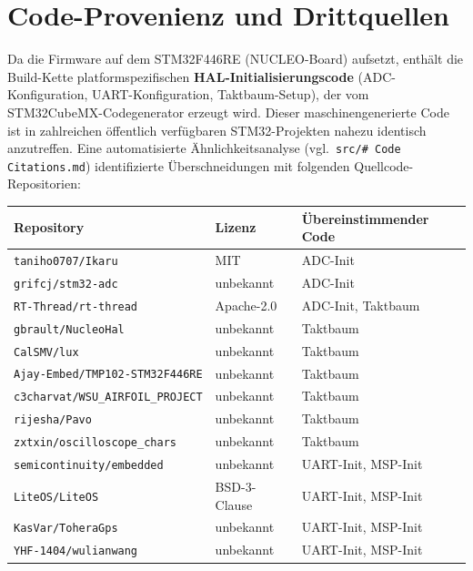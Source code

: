\section{Code-Provenienz und Drittquellen}
\label{sec:sensor_citations}

Da die Firmware auf dem STM32F446RE (NUCLEO-Board) aufsetzt, enthält die Build-Kette platformspezifischen \textbf{HAL-Initialisierungscode} (ADC-Konfiguration, UART-Konfiguration, Taktbaum-Setup), der vom STM32CubeMX-Codegenerator erzeugt wird.
Dieser maschinengenerierte Code ist in zahlreichen öffentlich verfügbaren STM32-Projekten nahezu identisch anzutreffen.
Eine automatisierte Ähnlichkeitsanalyse (vgl.\ \texttt{src/\# Code Citations.md}) identifizierte Überschneidungen mit folgenden Quellcode-Repositorien:

\begin{center}
  \begin{tabular}{l l l}
    \toprule
    Repository & Lizenz & Übereinstimmender Code \\
    \midrule
    \texttt{taniho0707/Ikaru} & MIT & ADC-Init \\
    \texttt{grifcj/stm32-adc} & unbekannt & ADC-Init \\
    \texttt{RT-Thread/rt-thread} & Apache-2.0 & ADC-Init, Taktbaum \\
    \texttt{gbrault/NucleoHal} & unbekannt & Taktbaum \\
    \texttt{CalSMV/lux} & unbekannt & Taktbaum \\
    \texttt{Ajay-Embed/TMP102-STM32F446RE} & unbekannt & Taktbaum \\
    \texttt{c3charvat/WSU\_AIRFOIL\_PROJECT} & unbekannt & Taktbaum \\
    \texttt{rijesha/Pavo} & unbekannt & Taktbaum \\
    \texttt{zxtxin/oscilloscope\_chars} & unbekannt & Taktbaum \\
    \texttt{semicontinuity/embedded} & unbekannt & UART-Init, MSP-Init \\
    \texttt{LiteOS/LiteOS} & BSD-3-Clause & UART-Init, MSP-Init \\
    \texttt{KasVar/ToheraGps} & unbekannt & UART-Init, MSP-Init \\
    \texttt{YHF-1404/wulianwang} & unbekannt & UART-Init, MSP-Init \\
    \bottomrule
  \end{tabular}
\end{center}

